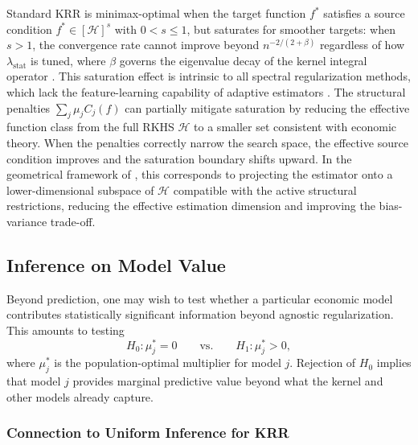 \begin{remark}
\label{rem:saturation}
Standard KRR is minimax-optimal when the target function $f^*$ satisfies
a source condition $f^* \in [\mathcal{H}]^s$ with $0 < s \leq 1$,
but saturates for smoother targets: when $s > 1$, the convergence rate
cannot improve beyond $n^{-2/(2+\beta)}$ regardless of how
$\lambda_{\mathrm{stat}}$ is tuned, where $\beta$ governs the eigenvalue
decay of the kernel integral operator \citep{li2023saturation,zhang2025optimal}.
This saturation effect is intrinsic to all spectral regularization methods,
which lack the feature-learning capability of adaptive estimators
\citep{barzilai2024spectral}.
The structural penalties $\sum_j \mu_j C_j(f)$ can partially mitigate
saturation by reducing the effective function class from the full RKHS
$\mathcal{H}$ to a smaller set consistent with economic theory.
When the penalties correctly narrow the search space, the effective
source condition improves and the saturation boundary shifts upward.
In the geometrical framework of \citet{zhang2024geometrical},
this corresponds to projecting the estimator onto a lower-dimensional
subspace of $\mathcal{H}$ compatible with the active structural
restrictions, reducing the effective estimation dimension and
improving the bias-variance trade-off.
\end{remark}

\subsection{Inference on Model Value}
\label{sub:inference}

Beyond prediction, one may wish to test whether a particular economic
model contributes statistically significant information beyond agnostic
regularization.
This amounts to testing
\begin{equation}
\label{eq:test_mu}
H_0: \mu_j^* = 0
\qquad \text{vs.} \qquad
H_1: \mu_j^* > 0,
\end{equation}
where $\mu_j^*$ is the population-optimal multiplier for model $j$.
Rejection of $H_0$ implies that model $j$ provides marginal predictive
value beyond what the kernel and other models already capture.

\subsubsection{Connection to Uniform Inference for KRR}
\label{sub:uniform_inference}

